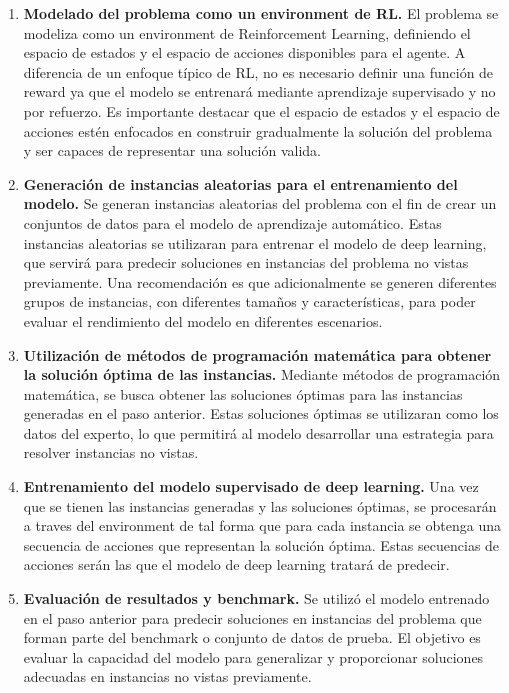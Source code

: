 \begin{enumerate}
    \item \textbf{Modelado del problema como un environment de RL.} El problema 
    se modeliza como un environment de Reinforcement Learning, definiendo el espacio de estados 
    y el espacio de acciones disponibles para el agente. A diferencia de un enfoque típico de RL, 
    no es necesario definir una función de reward ya que el modelo se entrenará mediante aprendizaje 
    supervisado y no por refuerzo. Es importante destacar que el espacio de estados y el espacio de
    acciones estén enfocados en construir gradualmente la solución del problema y ser capaces
    de representar una solución valida.
    \item \textbf{Generación de instancias aleatorias para el entrenamiento del modelo.} 
    Se generan instancias aleatorias del problema con el fin de crear un conjuntos de datos 
    para el modelo de aprendizaje automático. Estas instancias aleatorias se utilizaran para entrenar el 
    modelo de deep learning, que servirá para predecir soluciones en instancias del problema no vistas 
    previamente. Una recomendación es que adicionalmente se generen diferentes grupos de instancias,
    con diferentes tamaños y características, para poder evaluar el rendimiento del modelo en diferentes
    escenarios.
    \item \textbf{Utilización de métodos de programación matemática para obtener la solución óptima de 
    las instancias.} Mediante métodos de programación matemática, se busca obtener las soluciones óptimas 
    para las instancias generadas en el paso anterior. Estas soluciones óptimas se utilizaran como los 
    datos del experto, lo que permitirá al modelo desarrollar una estrategia para resolver instancias no vistas.
    \item \textbf{Entrenamiento del modelo supervisado de deep learning.} Una vez que se tienen las instancias
    generadas y las soluciones óptimas, se procesarán a traves del environment de tal forma que para cada
    instancia se obtenga una secuencia de acciones que representan la solución óptima. Estas secuencias de
    acciones serán las que el modelo de deep learning tratará de predecir.
    \item \textbf{Evaluación de resultados y benchmark.} Se utilizó el modelo entrenado 
    en el paso anterior para predecir soluciones en instancias del problema que forman parte del benchmark 
    o conjunto de datos de prueba. El objetivo es evaluar la capacidad del modelo para generalizar y 
    proporcionar soluciones adecuadas en instancias no vistas previamente.
\end{enumerate}

